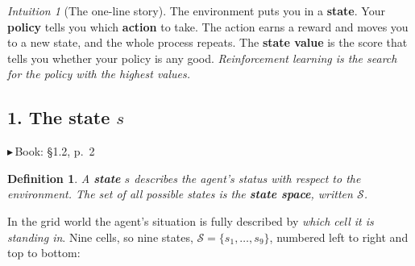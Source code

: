 \documentclass[11pt, letterpaper]{article}
\theoremstyle{runin}
\newtheorem*{definition}{Definition}
\theoremstyle{runinplain}
\theoremstyle{remark}
\newtheorem*{intuition}{Intuition}
\newcommand{\Sspace}{\mathcal{S}}
\newcommand{\bk}[1]{{\color{bookblue}\small$\blacktriangleright$\,\textsf{Book: #1}}}
\begin{document}
\begin{intuition}[The one-line story]
The environment puts you in a \textbf{state}. Your \textbf{policy} tells you which
\textbf{action} to take. The action earns a reward and moves you to a new state, and
the whole process repeats. The \textbf{state value} is the score that tells you
whether your policy is any good. \emph{Reinforcement learning is the search for the
policy with the highest values.}
\end{intuition}

\subsection*{1. The state $s$}

\bk{\S1.2, p.~2}

\begin{definition}
A \textbf{state} $s$ describes the agent's status with respect to the environment.
The set of all possible states is the \textbf{state space}, written $\Sspace$.
\end{definition}

In the grid world the agent's situation is fully described by \emph{which cell it is
standing in}. Nine cells, so nine states, $\Sspace=\{s_1,\dots,s_9\}$, numbered left
to right and top to bottom:

\begin{center}
\end{center}
\end{document}
